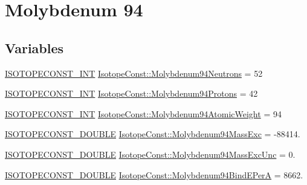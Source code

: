 \hypertarget{group___isotope_const-_molybdenum-_mo94}{}\section{Molybdenum 94}
\label{group___isotope_const-_molybdenum-_mo94}
\subsection*{Variables}
\begin{DoxyCompactItemize}
\item 
\mbox{\hyperlink{group___isotope_const-_macros_ga5f18360b3e99483a35c32d789e62621c}{I\+S\+O\+T\+O\+P\+E\+C\+O\+N\+S\+T\+\_\+\+I\+NT}} \mbox{\hyperlink{group___isotope_const-_molybdenum-_mo94_ga6bf1a2487431e5af447a8f5048d2ee7a}{Isotope\+Const\+::\+Molybdenum94\+Neutrons}} = 52
\item 
\mbox{\hyperlink{group___isotope_const-_macros_ga5f18360b3e99483a35c32d789e62621c}{I\+S\+O\+T\+O\+P\+E\+C\+O\+N\+S\+T\+\_\+\+I\+NT}} \mbox{\hyperlink{group___isotope_const-_molybdenum-_mo94_ga79d55ee43c5eacd646403048d3c41301}{Isotope\+Const\+::\+Molybdenum94\+Protons}} = 42
\item 
\mbox{\hyperlink{group___isotope_const-_macros_ga5f18360b3e99483a35c32d789e62621c}{I\+S\+O\+T\+O\+P\+E\+C\+O\+N\+S\+T\+\_\+\+I\+NT}} \mbox{\hyperlink{group___isotope_const-_molybdenum-_mo94_gacb2aad8bd37fd304afffdd239c3c7a1e}{Isotope\+Const\+::\+Molybdenum94\+Atomic\+Weight}} = 94
\item 
\mbox{\hyperlink{group___isotope_const-_macros_ga8f45a7272ce02c0b4c65c44636ed719a}{I\+S\+O\+T\+O\+P\+E\+C\+O\+N\+S\+T\+\_\+\+D\+O\+U\+B\+LE}} \mbox{\hyperlink{group___isotope_const-_molybdenum-_mo94_ga28a3fbd2654aeeb5e52f84d8d36645f2}{Isotope\+Const\+::\+Molybdenum94\+Mass\+Exc}} = -\/88414.
\item 
\mbox{\hyperlink{group___isotope_const-_macros_ga8f45a7272ce02c0b4c65c44636ed719a}{I\+S\+O\+T\+O\+P\+E\+C\+O\+N\+S\+T\+\_\+\+D\+O\+U\+B\+LE}} \mbox{\hyperlink{group___isotope_const-_molybdenum-_mo94_ga5754e36bd9024a7226f35a0c1315dc28}{Isotope\+Const\+::\+Molybdenum94\+Mass\+Exc\+Unc}} = 0.
\item 
\mbox{\hyperlink{group___isotope_const-_macros_ga8f45a7272ce02c0b4c65c44636ed719a}{I\+S\+O\+T\+O\+P\+E\+C\+O\+N\+S\+T\+\_\+\+D\+O\+U\+B\+LE}} \mbox{\hyperlink{group___isotope_const-_molybdenum-_mo94_ga1bac72eaa998232dde040b72ffa74011}{Isotope\+Const\+::\+Molybdenum94\+Bind\+E\+PerA}} = 8662.
\item 

\end{DoxyCompactItemize}
